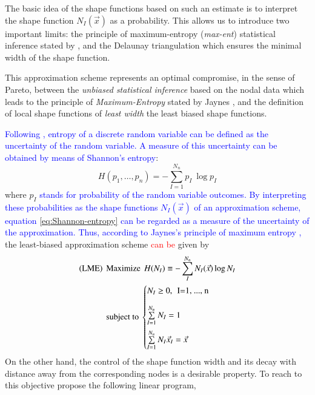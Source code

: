 \documentclass[preprint,12pt,a4paper]{elsarticle}
\begin{document}
The basic idea of the shape functions based on such an estimate is to interpret the shape function $N_I(\vec{x})$ as a probability. This allows us to introduce two important limits:
the principle of maximum-entropy (\textit{max-ent}) statistical
inference stated by \cite{Jaynes1957}, and the Delaunay triangulation
which ensures the minimal width of the shape function. 

This approximation scheme represents an optimal compromise, in the sense of Pareto, between the \textit{unbiased statistical inference} based on
the nodal data which leads to the principle of \textit{Maximum-Entropy}
stated by Jaynes \cite{Jaynes1957}, and the definition of local shape
functions of \textit{least width} the least biased shape functions.

\textcolor{blue}{Following \cite{Arroyo2006}, entropy of a discrete random variable can be defined as the uncertainty of the random variable. A measure of this uncertainty can be obtained by means of Shannon's entropy}:
\begin{equation}
  \label{eq:Shannon-entropy}
  H(p_1,\ldots,p_n) = -\sum^{N_n}_{I=1}{p_I\ \log p_I }
\end{equation}
where $p_I$ \textcolor{blue}{stands for probability of the random variable outcomes. By interpreting these probabilities as the shape functions $N_I(\vec{x})$ of an approximation scheme, equation \eqref{eq:Shannon-entropy} can be regarded as a measure of the uncertainty of the approximation. Thus, according to Jaynes's principle of maximum entropy \cite{Jaynes1957},} the least-biased approximation scheme  \textcolor{red}{can be} given by
\begin{align*}
  \label{eq:least-biased-approximation-scheme}
  \text{(LME)} \hspace{0.15cm} &\text{Maximize} \hspace{0.15cm} H(N_I) \equiv
  -\sum_{I}^{N_n}{N_I(\vec{x})\log N_I }\\
  &\text{subject to}\
  \begin{cases}
    N_I \ge 0, \hspace{0.15cm} \text{I=1, ..., n} \\[1em]   
    \sum\limits_{I=1}^{N_n}{N_I} = 1 \\[1em]   
    \sum\limits_{I=1}^{N_n}{N_I \vec{x}_I} = \vec{x} \\
  \end{cases}
\end{align*}
On the other hand, the control of the shape function width and its
decay with distance away from the corresponding nodes is a desirable property. To reach to this objective \cite{Arroyo2006} propose the following linear program,
\end{document}
